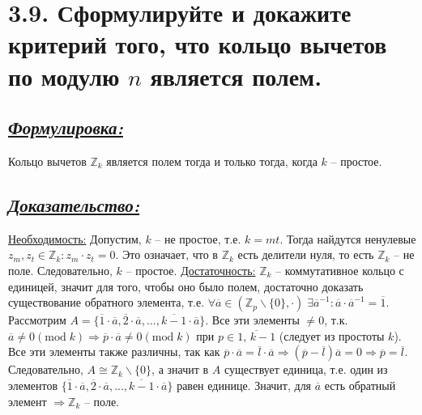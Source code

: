 \documentclass{article}
\begin{document}
\section*{\LARGE 3.9. Сформулируйте и докажите критерий того, что кольцо вычетов по модулю $n$ является полем. }
\subsection*{\Large \underline{\textit{Формулировка: }}}
Кольцо вычетов $\mathbb{Z}_k$ является полем тогда и только тогда, когда $k$ -- простое.

\subsection*{\Large \underline{\textit{Доказательство: }}}
$ $\indent \underline{Необходимость:}
\newline  Допустим, $k$ -- не простое, т.е. $k = mt$. Тогда найдутся ненулевые $z_m, z_t \in \mathbb{Z}_k : z_m \cdot z_t = 0$. Это означает, что в $\mathbb{Z}_k$ есть делители нуля, то есть $\mathbb{Z}_k$ -- не поле. Следовательно, $k$ -- простое.
\newline \indent \underline{Достаточность:}
\newline $\mathbb{Z}_k$ -- коммутативное кольцо с единицей, значит для того, чтобы оно было полем, достаточно доказать существование обратного элемента, т.е. 
\newline $\forall \overline{a} \in (\mathbb{Z}_p \backslash \{0\}, \cdot) \; \exists \overline{a}^{-1} : \overline{a}\cdot\overline{a}^{-1} = \overline{1}$. Рассмотрим $A = \{\overline{1}\cdot \overline{a}, \overline{2}\cdot \overline{a}, ..., \overline{k-1}\cdot \overline{a}\}$. Все эти элементы $\ne 0$, т.к. $\overline{a} \ne 0 (\mbox{mod}\; k) \Rightarrow \overline{p}\cdot\overline{a} \ne 0 (\mbox{mod}\; k)$ при $p \in \overline{1,\, k-1}$ (следует из простоты $k$). Все эти элементы также различны, так как \newline $\overline{p}\cdot\overline{a} = \overline{l}\cdot\overline{a} \Rightarrow (\overline{p}-\overline{l})\overline{a} = 0 \Rightarrow \overline{p} = \overline{l}$. Следовательно, $A \cong \mathbb{Z}_k \backslash \{0\}$, а значит в $A$ существует единица, т.е. один из элементов $\{\overline{1}\cdot \overline{a}, \overline{2}\cdot \overline{a}, ..., \overline{k-1}\cdot \overline{a}\}$ равен единице. Значит, для $\overline{a}$ есть обратный элемент $\Rightarrow \mathbb{Z}_k$ -- поле. 
\end{document}
